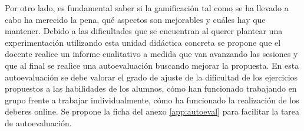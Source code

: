 Por otro lado, es fundamental saber si la gamificación tal como se ha llevado a cabo ha merecido la pena, qué aspectos son mejorables y cuáles hay que mantener.
%
Debido a las dificultades que se encuentran al querer plantear una experimentación utilizando esta unidad didáctica concreta se propone que el docente realice un informe cualitativo a medida que van avanzando las sesiones y que al final se realice una autoevaluación buscando mejorar la propuesta.
%
En esta autoevaluación se debe valorar el grado de ajuste de la dificultad de los ejercicios propuestos a las habilidades de los alumnos, 
%
cómo han funcionado trabajando en grupo frente a trabajar individualmente, cómo ha funcionado la realización de los deberes online.
%
Se propone la ficha del anexo \ref{app:autoeval} para facilitar la tarea de autoevaluación.

